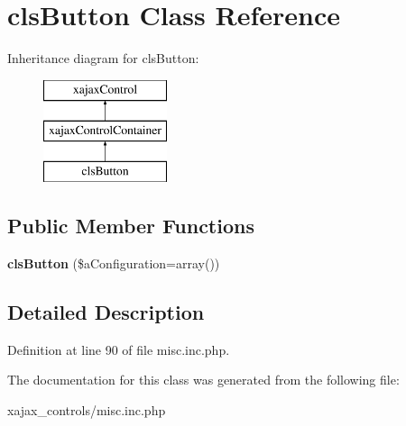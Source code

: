 \hypertarget{classclsButton}{
\section{clsButton Class Reference}
\label{classclsButton}
}
Inheritance diagram for clsButton:\begin{figure}[H]
\begin{center}
\leavevmode
\includegraphics[height=3.000000cm]{classclsButton}
\end{center}
\end{figure}
\subsection*{Public Member Functions}
\begin{DoxyCompactItemize}
\item 
\hypertarget{classclsButton_af1ece6d106354759d47923e99f22aa8f}{
{\bfseries clsButton} (\$aConfiguration=array())}
\label{classclsButton_af1ece6d106354759d47923e99f22aa8f}

\end{DoxyCompactItemize}


\subsection{Detailed Description}


Definition at line 90 of file misc.inc.php.



The documentation for this class was generated from the following file:\begin{DoxyCompactItemize}
\item 
xajax\_\-controls/misc.inc.php\end{DoxyCompactItemize}
